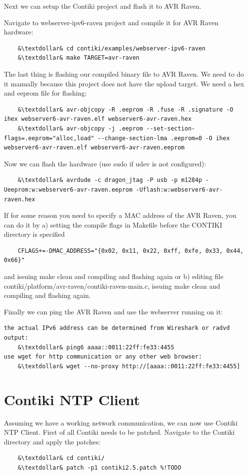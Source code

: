 \documentclass{article}
\begin{document}
Next we can setup the Contiki project and flash it to AVR Raven.

Navigate to webserver-ipv6-raven project and compile it for AVR Raven hardware:
\begin{lstlisting}
	&\textdollar& cd contiki/examples/webserver-ipv6-raven
	&\textdollar& make TARGET=avr-raven
\end{lstlisting}


The last thing is flashing our compiled binary file to AVR Raven.
We need to do it manually because this project does not have the upload target.
We need a hex and eeprom file for flashing:
\begin{lstlisting}
	&\textdollar& avr-objcopy -R .eeprom -R .fuse -R .signature -O ihex webserver6-avr-raven.elf webserver6-avr-raven.hex
	&\textdollar& avr-objcopy -j .eeprom --set-section-flags=.eeprom="alloc,load" --change-section-lma .eeprom=0 -O ihex webserver6-avr-raven.elf webserver6-avr-raven.eeprom
\end{lstlisting}
Now we can flash the hardware (use sudo if udev is not configured):
\begin{lstlisting}
	&\textdollar& avrdude -c dragon_jtag -P usb -p m1284p -Ueeprom:w:webserver6-avr-raven.eeprom -Uflash:w:webserver6-avr-raven.hex
\end{lstlisting}


If for some reason you need to specify a MAC address of the AVR Raven, you can do it by
a) setting the compile flags in Makefile before the CONTIKI directory is specified
\begin{lstlisting}
	CFLAGS+=-DMAC_ADDRESS="{0x02, 0x11, 0x22, 0xff, 0xfe, 0x33, 0x44, 0x66}"
\end{lstlisting}
and issuing make clean and compiling and flashing again
or
b) editing file contiki/platform/avr-raven/contiki-raven-main.c,
issuing make clean and compiling and flashing again.

Finally we can ping the AVR Raven and use the webserver running on it:
\begin{lstlisting}
the actual IPv6 address can be determined from Wireshark or radvd output:
	&\textdollar& ping6 aaaa::0011:22ff:fe33:4455
use wget for http communication or any other web browser:
	&\textdollar& wget --no-proxy http://[aaaa::0011:22ff:fe33:4455]
\end{lstlisting}

\section{Contiki NTP Client}
Assuming we have a working network communication,
we can now use Contiki NTP Client.
First of all Contiki needs to be patched.
Navigate to the Contiki directory and apply the patches:
\begin{lstlisting}
	&\textdollar& cd contiki/
	&\textdollar& patch -p1 contiki2.5.patch %!TODO
\end{lstlisting}
\end{document}
